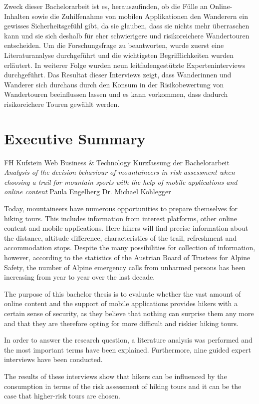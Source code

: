 Zweck dieser Bachelorarbeit ist es, herauszufinden, ob die Fülle an Online-Inhalten sowie die Zuhilfenahme von mobilen Applikationen den Wanderern ein gewisses Sicherheitsgefühl gibt, da sie glauben, dass sie nichts mehr überraschen kann und sie sich deshalb für eher schwierigere und risikoreichere Wandertouren entscheiden. Um die Forschungsfrage zu beantworten, wurde zuerst eine Literaturanalyse durchgeführt und die wichtigsten Begrifflichkeiten wurden erläutert. In weiterer Folge wurden neun leitfadengestützte Experteninterviews durchgeführt. Das Resultat dieser Interviews zeigt, dass Wanderinnen und Wanderer sich durchaus durch den Konsum in der Risikobewertung von Wandertouren beeinflussen lassen und es kann vorkommen, dass dadurch risikoreichere Touren gewählt werden.




\chapter*{Executive Summary}

FH Kufstein\newline
Web Business \& Technology\newline
Kurzfassung der Bachelorarbeit \textit{Analysis of the decision behaviour of mountaineers in risk assessment when choosing a trail for mountain sports with the help of mobile applications and online content}\newline
Paula Engelberg\newline
Dr. Michael Kohlegger

Today, mountaineers have numerous opportunities to prepare themselves for hiking tours. This includes information from interest platforms, other online content and mobile applications. Here hikers will find precise information about the distance, altitude difference, characteristics of the trail, refreshment and accommodation stops. Despite the many possibilities for collection of information, however, according to the statistics of the Austrian Board of Trustees for Alpine Safety, the number of Alpine emergency calls from unharmed persons has been increasing from year to year over the last decade.

The purpose of this bachelor thesis is to evaluate whether the vast amount of online content and the support of mobile applications provides hikers with a certain sense of security, as they believe that nothing can surprise them any more and that they are therefore opting for more difficult and riskier hiking tours. 

In order to answer the research question, a literature analysis was performed and the most important terms have been explained. Furthermore, nine guided expert interviews have been conducted. 

The results of these interviews show that hikers can be influenced by the consumption in terms of the risk assessment of hiking tours and it can be the case that higher-risk tours are chosen.



